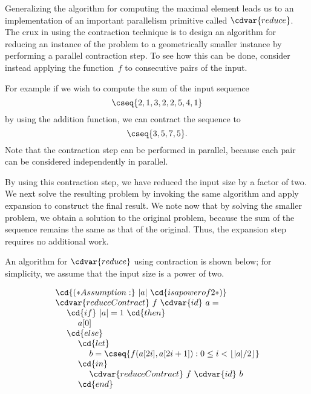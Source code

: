 \begin{gram}
Generalizing the algorithm for computing the maximal element leads us
to an implementation of an important parallelism primitive called $\cdvar{reduce}$.
%
The crux in using the contraction technique is to design an algorithm
for reducing an instance of the problem to a geometrically smaller
instance by performing a parallel contraction step.
%
To see how this can be done, consider instead applying the
function~$f$ to consecutive pairs of the input.
%

For example if we wish to compute the sum of the input sequence 
\[
\cseq{ 2,1,3,2,2,5,4,1}
\]
by using the addition function, we can contract the sequence to
\[
\cseq{ 3, 5, 7, 5 }.
\]
%
Note that the contraction step can be performed in parallel, because
each pair can be considered independently in parallel.

By using this contraction step, we have reduced the input size by a
factor of two.
%
We next solve the resulting problem by invoking the same algorithm and
apply expansion to construct the final result.
%
We note now that by solving the smaller problem, we obtain a solution
to the original problem, because the sum of the sequence remains the
same as that of the original.  Thus, the expansion step requires no
additional work.
%
\end{gram}

\begin{algorithm}
\label{alg:design::contraction::reduce}
An algorithm for $\cdvar{reduce}$ using contraction is shown below; for
simplicity, we assume that the input size is a power of two.
%

\[
\begin{array}{l}
\cd{(* Assumption:}~|a|~\cd{is a power of 2 *)}
\\
\cdvar{reduceContract}~f~\cdvar{id}~a =
\\ 
~~~~\cd{if}~|a| = 1~\cd{then}
\\
~~~~~~~~a[0]
\\
~~~~\cd{else}
\\ 
~~~~~~~~\cd{let}
\\
~~~~~~~~~~~~b = \cseq{f(a[2i],a[2i+1]) : 0 \le i < \lfloor |a|/2
  \rfloor}
\\ 
~~~~~~~~\cd{in}
\\
~~~~~~~~~~~~\cdvar{reduceContract}~f~\cdvar{id}~b
\\
~~~~~~~~\cd{end}
\end{array}
\]
\end{algorithm}
%

